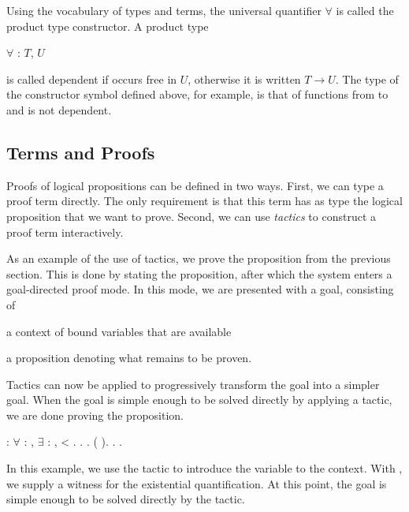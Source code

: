 Using the vocabulary of types and terms, the universal quantifier
$\forall$ is called the product type constructor. A product
type \begin{coqdoccode}$\forall$  : $T$,
  $U$\end{coqdoccode} is called dependent if  occurs free
in $U$, otherwise it is written $T \rightarrow U$. The type of the
constructor symbol  defined above, for example,
is that of functions from
to
and is not dependent.


\subsection{Terms and Proofs}

Proofs of logical propositions can be defined in two ways. First, we
can type a proof term directly. The only requirement is that this term
has as type the logical proposition that we want to prove. Second, we
can use \emph{tactics} to construct a proof term interactively.

As an example of the use of tactics, we prove the proposition from the
previous section. This is done by stating the proposition, after which
the system enters a goal-directed proof mode. In this mode, we are
presented with a goal, consisting of
\begin{inparaenum}[(i)]
\item a context of bound variables that are available
\item a proposition denoting what remains to be proven.
\end{inparaenum}
Tactics can now be applied to progressively transform the goal into a
simpler goal. When the goal is simple enough to be solved directly by
applying a tactic, we are done proving the proposition.
\begin{singlespace}
\begin{coqdoccode}
\coqdocnoindent
{}
 :
\ensuremath{\forall}  :
,
\ensuremath{\exists}  :
,
 < .\coqdoceol
\coqdocnoindent
{}.\coqdoceol
\coqdocindent{1.0em}
 .\coqdoceol
\coqdocindent{1.0em}
(
).\coqdoceol
\coqdocindent{1.0em}
.\coqdoceol
\coqdocnoindent
{}.\coqdoceol
\end{coqdoccode}
\end{singlespace}
In this example, we use the tactic  to introduce the
variable  to the context. With ,
we supply a witness for the existential quantification. At this point,
the goal is simple enough to be solved directly by the
 tactic.

